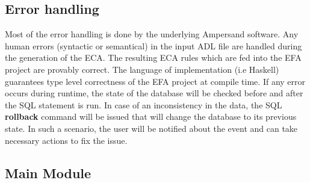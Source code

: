 \documentclass[12pt, svgnames]{article}
\begin{document}
\subsection{Error handling}
Most of the error handling is done by the underlying Ampersand software. Any human errors (syntactic or semantical) in the input ADL file are handled during the generation of the ECA. The resulting ECA rules which are fed into the EFA project are provably correct. The language of implementation (i.e Haskell) guarantees type level correctness of the EFA project at compile time. 
\newline
If any error occurs during runtime, the state of the database will be checked before and after the SQL statement is run. In case of an inconsistency in the data, the SQL \textbf{rollback} command will be issued that will change the database to its previous state. In such a scenario, the user will be notified about the event and can take necessary actions to fix the issue. 

\subsection{Main Module}
\end{document}
